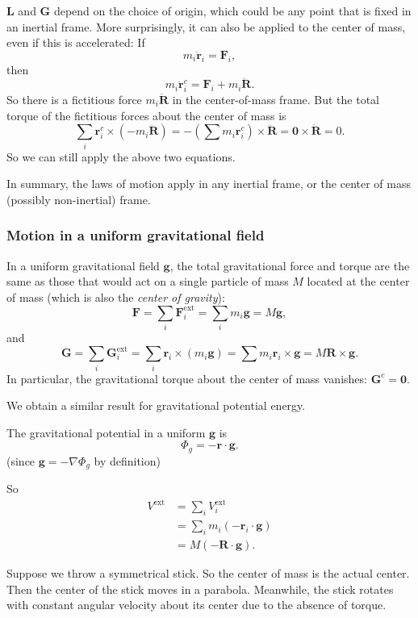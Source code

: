 \documentclass[a4paper]{article}
\begin{document}
$\mathbf{L}$ and $\mathbf{G}$ depend on the choice of origin, which could be any point that is fixed in an inertial frame. More surprisingly, it can also be applied to the center of mass, even if this is accelerated:
If
\[
  m_i \ddot{\mathbf{r}}_i = \mathbf{F}_i,
\]
then
\[
  m_i \ddot{\mathbf{r}}_i^c = \mathbf{F}_i + m_i \ddot{\mathbf{R}}.
\]
So there is a fictitious force $m_i \ddot{\mathbf{R}}$ in the center-of-mass frame. But the total torque of the fictitious forces about the center of mass is
\[
  \sum_i \mathbf{r}_i^c \times \left(-m_i \ddot{\mathbf{R}}\right) = -\left(\sum m_i \mathbf{r}_i^c\right) \times \ddot{\mathbf{R}} = \mathbf{0}\times \dot{\mathbf{R}} = 0.
\]
So we can still apply the above two equations.

In summary, the laws of motion apply in any inertial frame, or the center of mass (possibly non-inertial) frame.

\subsubsection*{Motion in a uniform gravitational field}
In a uniform gravitational field $\mathbf{g}$, the total gravitational force and torque are the same as those that would act on a single particle of mass $M$ located at the center of mass (which is also the \emph{center of gravity}):
\[
  \mathbf{F} = \sum_i \mathbf{F}_i^{\mathrm{ext}} = \sum_i m_i \mathbf{g} = M\mathbf{g},
\]
and
\[
  \mathbf{G} = \sum_i \mathbf{G}_i^{\mathrm{ext}} = \sum_i \mathbf{r}_i \times (m_i \mathbf{g}) = \sum m_i \mathbf{r}_i \times \mathbf{g} = M\mathbf{R}\times \mathbf{g}.
\]
In particular, the gravitational torque about the center of mass vanishes: $\mathbf{G}^c = \mathbf{0}$.

We obtain a similar result for gravitational potential energy.

The gravitational potential in a uniform $\mathbf{g}$ is
\[
  \Phi_g = -\mathbf{r}\cdot \mathbf{g}.
\]
(since $\mathbf{g} = -\nabla \Phi_g$ by definition)

So
\begin{align*}
  V^{\mathrm{ext}} &= \sum_i V_i^{\mathrm{ext}}\\
  &= \sum_i m_i (- \mathbf{r}_i \cdot \mathbf{g})\\
  &= M (-\mathbf{R}\cdot \mathbf{g}).
\end{align*}

\begin{eg}
  Suppose we throw a symmetrical stick. So the center of mass is the actual center. Then the center of the stick moves in a parabola. Meanwhile, the stick rotates with constant angular velocity about its center due to the absence of torque.
\end{eg}
\end{document}
